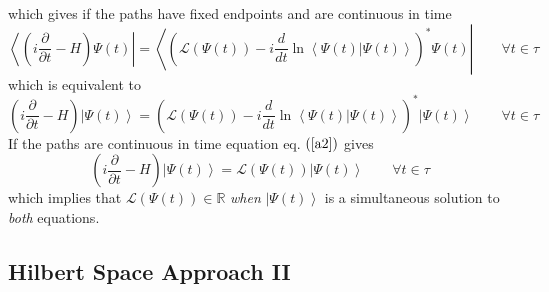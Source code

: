\documentclass[aps,preprint]{revtex4}
\begin{document}
which gives if the paths have fixed endpoints and are continuous in time 
\begin{equation}
\left\langle \left( i\frac{\partial }{\partial t}-H\right) \Psi \left(
t\right) \right\vert =\left\langle \left( \mathcal{L}\left( \Psi \left(
t\right) \right) -i\frac{d}{dt}\ln \left\langle \Psi \left( t\right) |\Psi
\left( t\right) \right\rangle \right) ^{\ast }\Psi \left( t\right)
\right\vert \qquad \forall t\in \tau 
\end{equation}%
which is equivalent to 
\begin{equation}
\left( i\frac{\partial }{\partial t}-H\right) \left\vert \Psi \left(
t\right) \right\rangle =\left( \mathcal{L}\left( \Psi \left( t\right)
\right) -i\frac{d}{dt}\ln \left\langle \Psi \left( t\right) |\Psi \left(
t\right) \right\rangle \right) ^{\ast }\left\vert \Psi \left( t\right)
\right\rangle \qquad \forall t\in \tau 
\end{equation}%
If the paths are continuous in time equation eq. $\left( \ref{a2}\right) $
gives 
\begin{equation}
\left( i\frac{\partial }{\partial t}-H\right) \left\vert \Psi \left(
t\right) \right\rangle =\mathcal{L}\left( \Psi \left( t\right) \right)
\left\vert \Psi \left( t\right) \right\rangle \qquad \forall t\in \tau 
\end{equation}%
which implies that $\mathcal{L}\left( \Psi \left( t\right) \right) \in 
\mathbb{R}$ \emph{when} $\left\vert \Psi \left( t\right) \right\rangle $ is
a simultaneous solution to \emph{both }equations.

\subsection{Hilbert Space Approach II}
\end{document}
